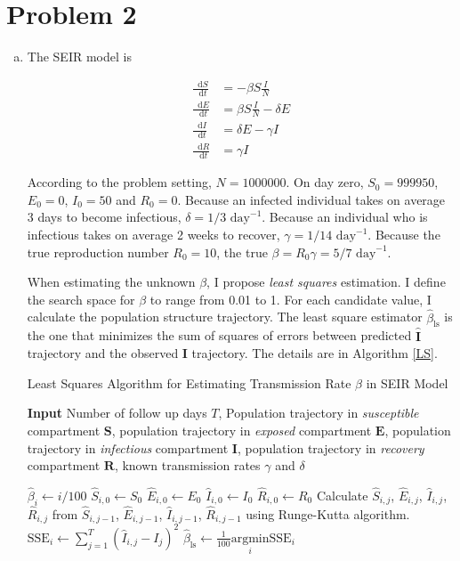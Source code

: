 \documentclass[12pt]{article}
\newcommand*\diff{\mathop{}\!\mathrm{d}}
\begin{document}
\section*{Problem 2}
\begin{enumerate}[(a)]


\item The SEIR model is

\begin{align*}
	\frac{\diff S}{\diff t} &= -\beta S \frac{I}{N}\\
	\frac{\diff E}{\diff t} &= \beta S \frac{I}{N} - \delta E\\
	\frac{\diff I}{\diff t} &= \delta E - \gamma I\\
	\frac{\diff R}{\diff t} &= \gamma I
\end{align*}

According to the problem setting, $N=1000000$. On day zero, $S_{0}=999950$, $E_{0}=0$, $I_{0}=50$ and $R_{0}=0$. Because an infected individual takes on average 3 days to become infectious, $\delta=1/3$ $\text{day}^{-1}$. Because an individual who is infectious takes on average 2 weeks to recover, $\gamma=1/14$ $\text{day}^{-1}$. Because the true reproduction number $R_{0}=10$, the true $\beta=R_{0} \gamma=5/7$ $\text{day}^{-1}$.

When estimating the unknown $\beta$, I propose \emph{least squares} estimation. I define the search space for $\beta$ to range from 0.01 to 1. For each candidate value, I calculate the population structure trajectory. The least square estimator $\hat{\beta}_\text{ls}$ is the one that minimizes the sum of squares of errors between predicted $\hat{\bm{I}}$ trajectory and the observed $\bm{I}$ trajectory. The details are in Algorithm \ref{LS}.


\begin{algorithm}[htbp]
	\caption{Least Squares Algorithm for Estimating Transmission Rate $\beta$ in SEIR Model}\label{LS}
	\hspace*{\algorithmicindent} \textbf{Input} Number of follow up days $T$,  Population trajectory in \emph{susceptible} compartment $\bm{S}$, population trajectory in \emph{exposed} compartment $\bm{E}$, population trajectory in \emph{infectious} compartment $\bm{I}$, population trajectory in \emph{recovery} compartment $\bm{R}$, known transmission rates $\gamma$ and $\delta$
	
	\begin{algorithmic}[1]
		\State $\hat{\beta}_{i} \gets i/100$ 
		\State $\hat{S}_{i,0} \gets S_{0}$ 
		\State $\hat{E}_{i,0} \gets E_0$
		\State $\hat{I}_{i,0} \gets I_{0}$
		\State $\hat{R}_{i,0} \gets R_0$
				\State Calculate $\hat{S}_{i,j}$, $\hat{E}_{i,j}$, $\hat{I}_{i,j}$, $\hat{R}_{i,j}$ from $\hat{S}_{i,j-1}$, $\hat{E}_{i,j-1}$, $\hat{I}_{i,j-1}$, $\hat{R}_{i,j-1}$ using Runge-Kutta algorithm.
			\EndFor
		\State $\text{SSE}_{i} \gets \sum_{j=1}^{T} (\hat{I}_{i,j} - I_{j})^2$
		\EndFor
		\State $\hat{\beta}_\text{ls} \gets \frac{1}{100}\underset{i}{\mathrm{argmin}}\text{SSE}_{i}$	
	\end{algorithmic}
	

\end{algorithm}
\end{enumerate}
\end{document}
